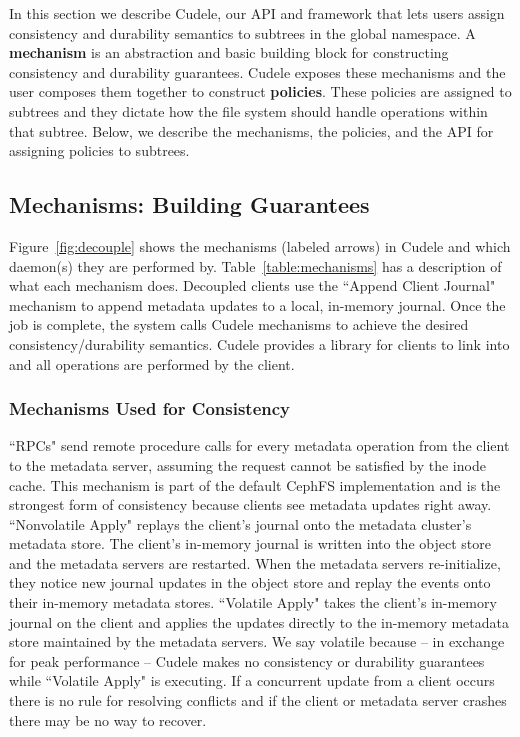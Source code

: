 In this section we describe Cudele, our API and framework that lets users
assign consistency and durability semantics to subtrees in the global
namespace. A \textbf{mechanism} is an abstraction and basic building block for
constructing consistency and durability guarantees. Cudele exposes these
mechanisms and the user composes them together to construct
\textbf{policies}. These policies are assigned to subtrees and they dictate how
the file system should handle operations within that subtree.  Below, we
describe the mechanisms, the policies, and the API for assigning policies to
subtrees.

\subsection{Mechanisms: Building Guarantees}
\label{sec:the-cudelesfs-mechanisms}

Figure~\ref{fig:decouple} shows the mechanisms (labeled arrows) in Cudele and
which daemon(s) they are performed by.  Table~\ref{table:mechanisms} has a
description of what each mechanism does.  Decoupled clients use the ``Append Client Journal"
mechanism to append metadata updates to a local, in-memory journal. Once the
job is complete, the system calls Cudele mechanisms to achieve the desired
consistency/durability semantics.  Cudele provides a library for clients to
link into and all operations are performed by the client.  

\subsubsection{Mechanisms Used for Consistency} ``RPCs" send remote procedure
calls for every metadata operation from the client to the metadata server,
assuming the request cannot be satisfied by the inode cache. This mechanism is
part of the default CephFS implementation and is the strongest form of
consistency because clients see metadata updates right away.  ``Nonvolatile
Apply" replays the client's journal onto the metadata cluster's metadata store.
The client's in-memory journal is written into the object store and the
metadata servers are restarted. When the metadata servers re-initialize, they
notice new journal updates in the object store and replay the events onto their
in-memory metadata stores.  ``Volatile Apply" takes the client's in-memory journal on the
client and applies the updates directly to the in-memory metadata store maintained
by the metadata servers. We say volatile because -- in exchange for peak
performance -- Cudele makes no consistency or durability guarantees while
``Volatile Apply" is executing.  If a concurrent update from a client occurs
there is no rule for resolving conflicts and if the client or metadata server
crashes there may be no way to recover.

